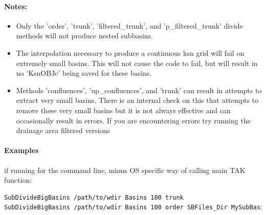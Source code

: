 \paragraph{Notes:}
\begin{itemize}
\item Only the 'order', 'trunk', 'filtered\_trunk', and 'p\_filtered\_trunk' divide methods will not produce nested subbasins.
\item The interpolation necessary to produce a continuous ksn grid will fail on extremely small basins. This will not cause the code to fail, but will result in
no 'KsnOBJc' being saved for these basins.
\item Methods 'confluences', 'up\_confluences', and 'trunk' can result in attempts to extract very small basins. There is an internal check on this that attempts to remove 
these very small basins but it is not always effective and can occasionally result in errors. If you are encountering errors try running the drainage area
filtered versions
\end{itemize}

\paragraph{Examples} if running for the command line, minus OS specific way of calling main TAK function:
\begin{lstlisting}[language=bash]
SubDivideBigBasins /path/to/wdir Basins 100 trunk 
SubDivideBigBasins /path/to/wdir Basins 100 order SBFiles_Dir MySubBasins order 4
\end{lstlisting}




